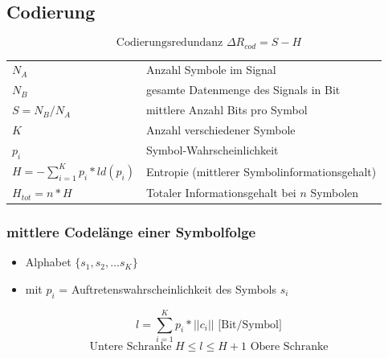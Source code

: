 \documentclass[10pt]{article}
\begin{document}
\subsection{Codierung}
\begin{equation*}
	\text{Codierungsredundanz } \Delta R_{cod} = S - H
\end{equation*} 
\begin{tabular}{l l}
	$N_A$ & Anzahl Symbole im Signal \\
	$N_B$ & gesamte Datenmenge des Signals in Bit \\
	$S=N_B / N_A$ & mittlere Anzahl Bits pro Symbol \\
	$K$ & Anzahl verschiedener Symbole \\
	$p_i$ & Symbol-Wahrscheinlichkeit \\
	$H=-\sum_{i=1}^K p_i*ld(p_i)$ & Entropie (mittlerer Symbolinformationsgehalt) \\
	$H_{tot} = n * H$ & Totaler Informationsgehalt bei $n$ Symbolen\\
\end{tabular}

\subsubsection{mittlere Codelänge einer Symbolfolge}
\begin{itemize}
	\item Alphabet $\{s_1, s_2, \dots s_K \}$
	\item mit $p_i$ = Auftretenswahrscheinlichkeit des Symbols $s_i$
\end{itemize}
\begin{equation*}
	l = \sum_{i=1}^K p_i * ||c_i|| \text{ [Bit/Symbol]}
\end{equation*}
\begin{equation*}
	\text{Untere Schranke } H \leq l \leq H+1 \text{ Obere Schranke}
\end{equation*}
\end{document}
